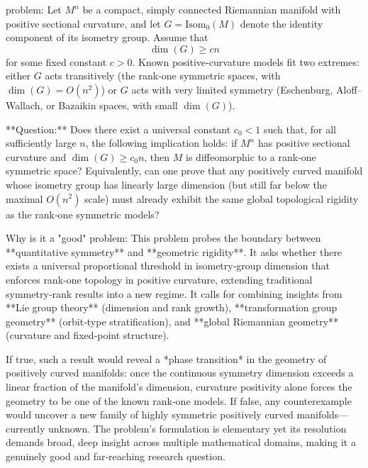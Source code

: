 problem:  
Let \(M^n\) be a compact, simply connected Riemannian manifold with positive sectional curvature, and let \(G = \mathrm{Isom}_0(M)\) denote the identity component of its isometry group.  Assume that  
\[
\dim(G) \ge c n
\]
for some fixed constant \(c > 0\).  Known positive‑curvature models fit two extremes: either \(G\) acts transitively (the rank‑one symmetric spaces, with \(\dim(G) = O(n^2)\)) or \(G\) acts with very limited symmetry (Eschenburg, Aloff–Wallach, or Bazaikin spaces, with small \(\dim(G)\)).  

**Question:**  
Does there exist a universal constant \(c_0 < 1\) such that, for all sufficiently large \(n\), the following implication holds: if \(M^n\) has positive sectional curvature and \(\dim(G) \ge c_0 n\), then \(M\) is diffeomorphic to a rank‑one symmetric space?  
Equivalently, can one prove that any positively curved manifold whose isometry group has linearly large dimension (but still far below the maximal \(O(n^2)\) scale) must already exhibit the same global topological rigidity as the rank‑one symmetric models?

Why is it a "good" problem:  
This problem probes the boundary between **quantitative symmetry** and **geometric rigidity**.  It asks whether there exists a universal proportional threshold in isometry‑group dimension that enforces rank‑one topology in positive curvature, extending traditional symmetry‑rank results into a new regime.  It calls for combining insights from **Lie group theory** (dimension and rank growth), **transformation group geometry** (orbit‑type stratification), and **global Riemannian geometry** (curvature and fixed‑point structure).  

If true, such a result would reveal a *phase transition* in the geometry of positively curved manifolds: once the continuous symmetry dimension exceeds a linear fraction of the manifold’s dimension, curvature positivity alone forces the geometry to be one of the known rank‑one models.  If false, any counterexample would uncover a new family of highly symmetric positively curved manifolds—currently unknown.  The problem’s formulation is elementary yet its resolution demands broad, deep insight across multiple mathematical domains, making it a genuinely good and far‑reaching research question.